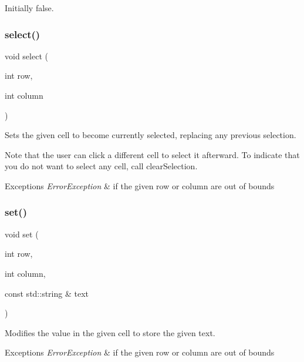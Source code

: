 Initially false. \mbox{\label{classsgl_1_1GTable_ab06a36d6ed149c8477a1a9d32be2ba43}} 
\subsubsection{\texorpdfstring{select()}{select()}}
{\footnotesize\ttfamily void select (\begin{DoxyParamCaption}\item[{int}]{row,  }\item[{int}]{column }\end{DoxyParamCaption})\hspace{0.3cm}{\ttfamily [virtual]}}



Sets the given cell to become currently selected, replacing any previous selection. 

Note that the user can click a different cell to select it afterward. To indicate that you do not want to select any cell, call clear\+Selection. 
\begin{DoxyExceptions}{Exceptions}
{\em Error\+Exception} & if the given row or column are out of bounds \\
\hline
\end{DoxyExceptions}
\mbox{\label{classsgl_1_1GTable_ad1a09eece3a11ef4d2c56a951ae06a69}} 
\subsubsection{\texorpdfstring{set()}{set()}}
{\footnotesize\ttfamily void set (\begin{DoxyParamCaption}\item[{int}]{row,  }\item[{int}]{column,  }\item[{const std\+::string \&}]{text }\end{DoxyParamCaption})\hspace{0.3cm}{\ttfamily [virtual]}}



Modifies the value in the given cell to store the given text. 


\begin{DoxyExceptions}{Exceptions}
{\em Error\+Exception} & if the given row or column are out of bounds \\
\hline
\end{DoxyExceptions}
\mbox{\label{classsgl_1_1GInteractor_ad15f102f62e2960576012f1aa0ba4b2e}} 
